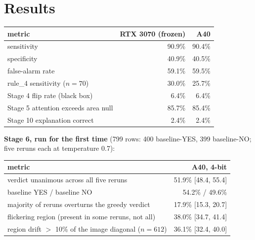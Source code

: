 \section{Results}

\begin{center}
\begin{tabular}{p{6.2cm}rr}
\toprule
\textbf{metric} & \textbf{RTX 3070 (frozen)} & \textbf{A40} \\
\midrule
sensitivity                         & 90.9\% & 90.4\% \\
specificity                         & 40.9\% & 40.5\% \\
false-alarm rate                    & 59.1\% & 59.5\% \\
rule\_4 sensitivity ($n=70$)        & 30.0\% & 25.7\% \\
Stage 4 flip rate (black box)       & 6.4\%  & 6.4\%  \\
Stage 5 attention exceeds area null & 85.7\% & 85.4\% \\
Stage 10 explanation correct        & 2.4\%  & 2.4\%  \\
\bottomrule
\end{tabular}
\label{tab:s21-parity}
\end{center}

\textbf{Stage 6, run for the first time} (799 rows: 400 baseline-YES, 399 baseline-NO; five reruns each at
temperature 0.7):

\begin{center}
\begin{tabular}{p{7.4cm}r}
\toprule
\textbf{metric} & \textbf{A40, 4-bit} \\
\midrule
verdict unanimous across all five reruns    & 51.9\% [48.4, 55.4] \\
\quad baseline YES / baseline NO            & 54.2\% / 49.6\% \\
majority of reruns overturns the greedy verdict & 17.9\% [15.3, 20.7] \\
flickering region (present in some reruns, not all) & 38.0\% [34.7, 41.4] \\
region drift $>$ 10\% of the image diagonal ($n=612$) & 36.1\% [32.4, 40.0] \\
\bottomrule
\end{tabular}
\label{tab:s21-stability}
\end{center}

